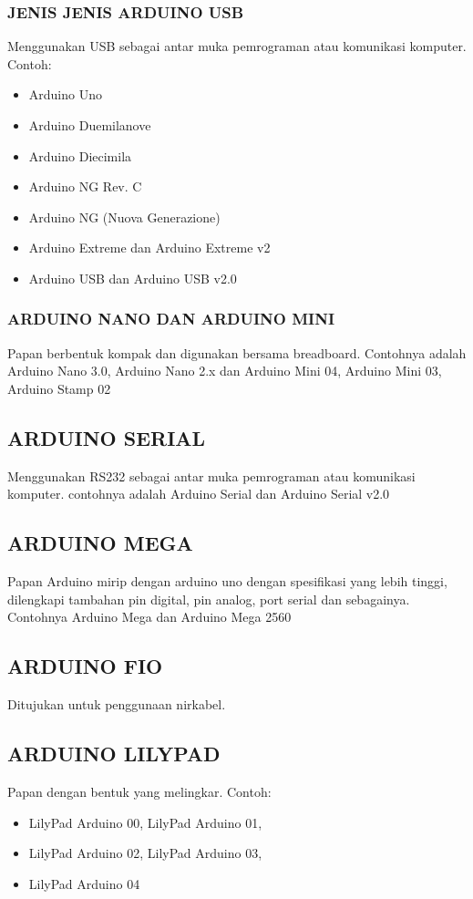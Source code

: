 \subsubsection {JENIS JENIS ARDUINO USB}
Menggunakan USB sebagai antar muka pemrograman atau komunikasi komputer. Contoh:
\begin{itemize} 
\item Arduino Uno
\item Arduino Duemilanove
\item Arduino Diecimila
\item Arduino NG Rev. C
\item Arduino NG (Nuova Generazione)
\item Arduino Extreme dan Arduino Extreme v2
\item Arduino USB dan Arduino USB v2.0 
\end{itemize}

\subsubsection {ARDUINO NANO DAN ARDUINO MINI}
Papan berbentuk kompak dan digunakan bersama breadboard. Contohnya adalah Arduino Nano 3.0, Arduino Nano 2.x dan Arduino Mini 04, Arduino Mini 03, Arduino Stamp 02

\subsection {ARDUINO SERIAL}
Menggunakan RS232 sebagai antar muka pemrograman atau komunikasi komputer. contohnya adalah Arduino Serial dan Arduino Serial v2.0  

\subsection {ARDUINO MEGA}
Papan Arduino mirip dengan arduino uno dengan spesifikasi yang lebih tinggi, dilengkapi tambahan pin digital, pin analog, port serial dan sebagainya.  Contohnya Arduino Mega dan Arduino Mega 2560  

\subsection {ARDUINO FIO}
Ditujukan untuk penggunaan nirkabel. 

\subsection {ARDUINO LILYPAD}
Papan dengan bentuk yang melingkar. Contoh: 
\begin{itemize}
\item  LilyPad Arduino 00, LilyPad Arduino 01, 
\item LilyPad Arduino 02, LilyPad Arduino 03,
\item LilyPad Arduino 04
\end{itemize}
